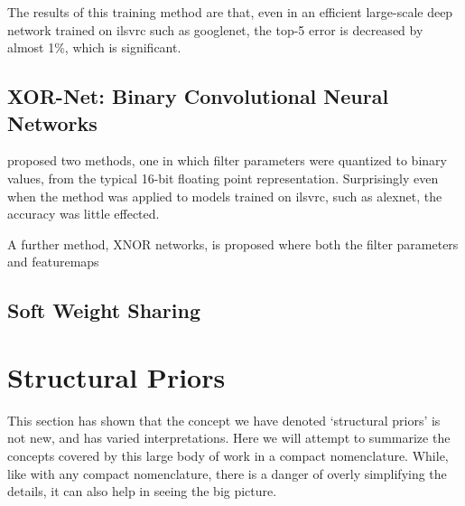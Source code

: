 \documentclass[thesis]{subfiles}
\begin{document}
	The results of this training method are that, even in an efficient large-scale deep network trained on \gls{ilsvrc} such as \gls{googlenet}, the top-5 error is decreased by almost 1\%, which is significant.
	
	\subsection{XOR-Net: Binary Convolutional Neural Networks}
	\citet{rastegari2016xnor} proposed two methods, one in which filter parameters were quantized to binary values, from the typical 16-bit floating point representation. Surprisingly even when the method was applied to models trained on \gls{ilsvrc}, such as \gls{alexnet}, the accuracy was little effected.

	A further method, XNOR networks, is proposed where both the filter parameters and \glspl{featuremap}
	
	\subsection{Soft Weight Sharing}
	\citet{ullrich2017soft,}

\section{Structural Priors}
	This section has shown that the concept we have denoted `structural priors' is not new, and has varied interpretations. Here we will attempt to summarize the concepts covered by this large body of work in a compact nomenclature. While, like with any compact nomenclature, there is a danger of overly simplifying the details, it can also help in seeing the big picture.
    
\end{document}
